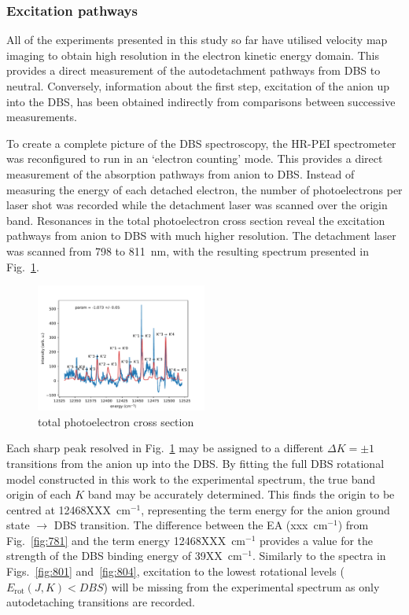 \documentclass[journal=jpcafh,manuscript=article,layout=onecolumn, 12pt]{achemso}
\begin{document}
\subsubsection{Excitation pathways}
All of the experiments presented in this study so far have utilised velocity map imaging to obtain high resolution in the electron kinetic energy domain. This provides a direct measurement of the autodetachment pathways from DBS to neutral. Conversely, information about the first step, excitation of the anion up into the DBS, has been obtained indirectly from comparisons between successive measurements. 

To create a complete picture of the DBS spectroscopy, the HR-PEI spectrometer was reconfigured to run in an `electron counting' mode. This provides a direct measurement of the absorption pathways from anion to DBS. Instead of measuring the energy of each detached electron, the number of photoelectrons per laser shot was recorded while the detachment laser was scanned over the origin band. Resonances in the total photoelectron cross section reveal the excitation pathways from anion to DBS with much higher resolution. The detachment laser was scanned from 798 to 811~nm, with the resulting spectrum presented in Fig.~\ref{fig:scan}.

\begin{figure}
	\includegraphics[width=0.5\textwidth]{scripts/scan}
	\caption{total photoelectron cross section}
	\label{fig:scan}
\end{figure}

Each sharp peak resolved in Fig.~\ref{fig:scan} may be assigned to a different $\Delta K=\pm1$ transitions from the anion up into the DBS. By fitting the full DBS rotational model constructed in this work to the experimental spectrum, the true band origin of each $K$ band may be accurately determined. This finds the origin to be centred at 12468XXX~cm$^{-1}$, representing the term energy for the anion ground state $\rightarrow$ DBS transition. The difference between the EA (xxx~cm$^{-1}$) from Fig.~\ref{fig:781} and the term energy 12468XXX~cm$^{-1}$ provides a value for the strength of the DBS binding energy of 39XX~cm$^{-1}$. Similarly to the spectra in Figs.~\ref{fig:801} and~\ref{fig:804}, excitation to the lowest rotational levels ($E_{\text{rot}}(J,K) < DBS$) will be missing from the experimental spectrum as only autodetaching transitions are recorded. 
\end{document}
